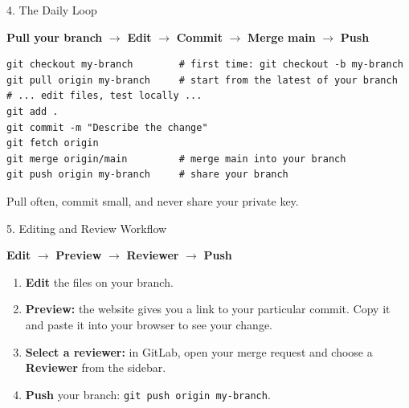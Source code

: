 \documentclass[aspectratio=169,11pt]{beamer}
\begin{document}
\begin{frame}[fragile]{4. The Daily Loop}
  \begin{center}
    \Large \textbf{\color{accent}Pull your branch} $\rightarrow$ \textbf{Edit} $\rightarrow$ \textbf{Commit} $\rightarrow$ \textbf{Merge main} $\rightarrow$ \textbf{Push}
  \end{center}
  \vspace{0.4em}
\begin{lstlisting}
git checkout my-branch        # first time: git checkout -b my-branch
git pull origin my-branch     # start from the latest of your branch
# ... edit files, test locally ...
git add .
git commit -m "Describe the change"
git fetch origin
git merge origin/main         # merge main into your branch
git push origin my-branch     # share your branch
\end{lstlisting}
  \vspace{0.4em}
  Pull often, commit small, and never share your private key.
\end{frame}

\begin{frame}{5. Editing and Review Workflow}
  \begin{center}
    \Large \textbf{\color{accent}Edit} $\rightarrow$ \textbf{Preview} $\rightarrow$ \textbf{Reviewer} $\rightarrow$ \textbf{Push}
  \end{center}
  \vspace{0.3em}
  \begin{enumerate}
    \setlength\itemsep{0.6em}
    \item \textbf{Edit} the files on your branch.
    \item \textbf{Preview:} the website gives you a link to your particular commit. Copy it and paste it into your browser to see your change.
    \item \textbf{Select a reviewer:} in GitLab, open your merge request and choose a \textbf{Reviewer} from the sidebar.
    \item \textbf{Push} your branch: \texttt{git push origin my-branch}.
  \end{enumerate}
\end{frame}
\end{document}
